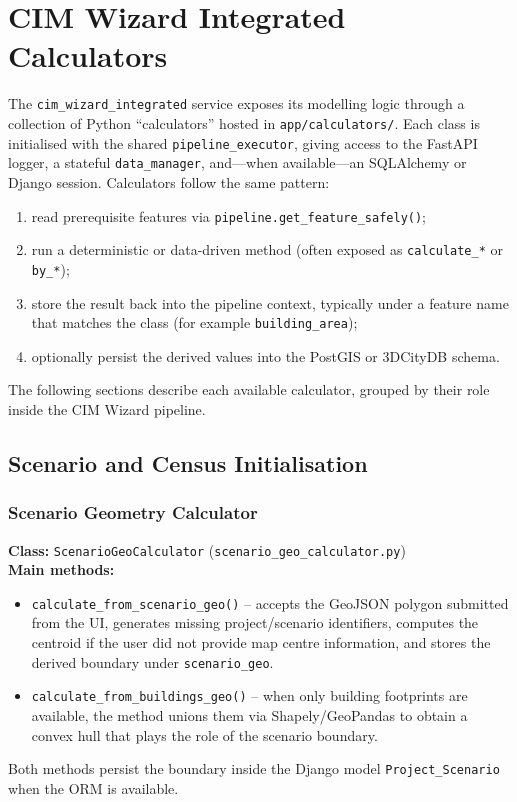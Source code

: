 \chapter{CIM Wizard Integrated Calculators}
\label{app:calculators}

The \texttt{cim\_wizard\_integrated} service exposes its modelling logic through a
collection of Python ``calculators'' hosted in
\texttt{app/calculators/}. Each class is initialised with the shared
\texttt{pipeline\_executor}, giving access to the FastAPI logger, a
stateful \texttt{data\_manager}, and---when available—an SQLAlchemy or
Django session. Calculators follow the same pattern:
\begin{enumerate}[label=\alph*)]
    \item read prerequisite features via \texttt{pipeline.get\_feature\_safely()};
    \item run a deterministic or data-driven method (often exposed as
    \texttt{calculate\_*} or \texttt{by\_*});
    \item store the result back into the pipeline context, typically under a
    feature name that matches the class (for example
    \texttt{building\_area});
    \item optionally persist the derived values into the PostGIS or 3DCityDB schema.
\end{enumerate}
The following sections describe each available calculator, grouped by
their role inside the CIM Wizard pipeline.

\section{Scenario and Census Initialisation}
\subsection{Scenario Geometry Calculator}
\textbf{Class:} \texttt{ScenarioGeoCalculator} (\texttt{scenario\_geo\_calculator.py})\\
\textbf{Main methods:}
\begin{itemize}[leftmargin=2em]
    \item \texttt{calculate\_from\_scenario\_geo()} – accepts the GeoJSON
    polygon submitted from the UI, generates missing project/scenario
    identifiers, computes the centroid if the user did not provide map
    centre information, and stores the derived boundary under
    \texttt{scenario\_geo}.
    \item \texttt{calculate\_from\_buildings\_geo()} – when only
    building footprints are available, the method unions them via
    Shapely/GeoPandas to obtain a convex hull that plays the role of the
    scenario boundary.
\end{itemize}
Both methods persist the boundary inside the Django model
\texttt{Project\_Scenario} when the ORM is available.

